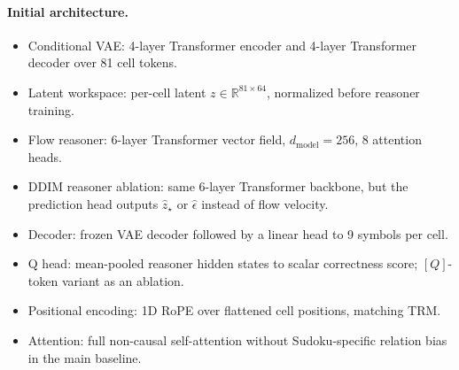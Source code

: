 \documentclass[11pt]{article}
\begin{document}
\paragraph{Initial architecture.}
\begin{itemize}[itemsep=0pt]
    \item Conditional VAE: 4-layer Transformer encoder and 4-layer Transformer decoder over 81 cell tokens.
    \item Latent workspace: per-cell latent \(z\in\mathbb R^{81\times 64}\), normalized before reasoner training.
    \item Flow reasoner: 6-layer Transformer vector field, \(d_{\mathrm{model}}=256\), 8 attention heads.
    \item DDIM reasoner ablation: same 6-layer Transformer backbone, but the prediction head outputs \(\hat z_\star\) or \(\hat\epsilon\) instead of flow velocity.
    \item Decoder: frozen VAE decoder followed by a linear head to 9 symbols per cell.
    \item Q head: mean-pooled reasoner hidden states to scalar correctness score; \([Q]\)-token variant as an ablation.
    \item Positional encoding: 1D RoPE over flattened cell positions, matching TRM.
    \item Attention: full non-causal self-attention without Sudoku-specific relation bias in the main baseline.
\end{itemize}
\end{document}
